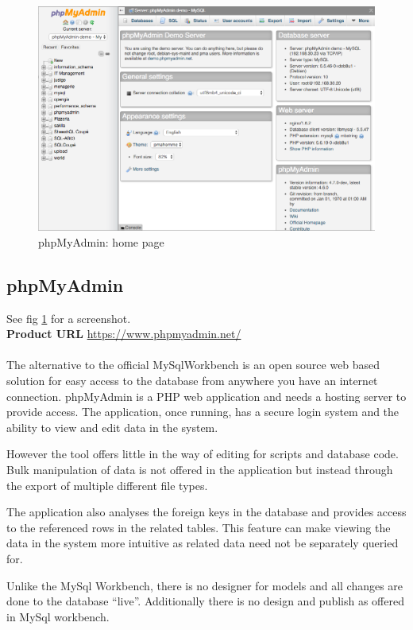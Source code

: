 \begin{figure}
  \includegraphics[width=\linewidth]{Figures/phpmyadmin.png}
  \caption{phpMyAdmin: home page}
  \label{fig:phpmyadmin}
\end{figure}


\subsection{phpMyAdmin}\label{phpmyadmin}

\noindent
See fig \ref{fig:phpmyadmin} for a screenshot.
\noindent\\
\textbf{Product URL}\cite{phpmyadmin}
\url{https://www.phpmyadmin.net/}
\\
\\
\noindent
The alternative to the official MySqlWorkbench is an open source web
based solution for easy access to the database from anywhere you have an
internet connection. phpMyAdmin is a PHP web application and needs a
hosting server to provide access. The application, once running,
has a secure login system and the ability to view and edit data in the
system.

However the tool offers little in the way of editing for scripts and
database code. Bulk manipulation of data is not offered in the
application but instead through the export of multiple different file
types.

The application also analyses the foreign keys in the database and provides
access to the referenced rows in the related tables. This feature can make
viewing the data in the system more intuitive as related data need not be
separately queried for.

Unlike the MySql Workbench, there is no designer for models and all
changes are done to the database ``live''. Additionally there is no design and
publish as offered in MySql workbench.

